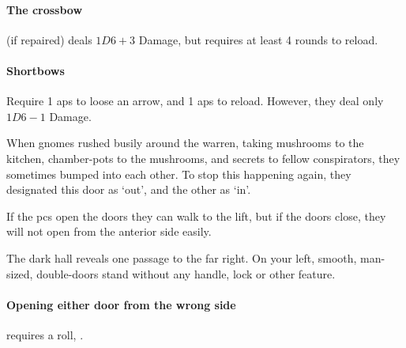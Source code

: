 \begin{multicols}{2}
{  \paragraph{The crossbow}
  (if repaired) deals $1D6+3$ Damage, but requires at least 4 rounds to reload.

  \paragraph{Shortbows}
  Require 1 \glspl{ap} to loose an arrow, and 1 \glspl{ap} to reload.
  However, they deal only $1D6-1$ Damage.
}{}



\begin{exampletext}
  When gnomes rushed busily around the warren, taking mushrooms to the kitchen, chamber-pots to the mushrooms, and secrets to fellow conspirators, they sometimes bumped into each other.
  To stop this happening again, they designated this door as `out', and the other as `in'.
\end{exampletext}

If the \glspl{pc} open the doors they can walk to the lift, but if the doors close, they will not open from the anterior side easily.

\begin{boxtext}
  The dark hall reveals one passage to the far right.
  On your left, smooth, man-sized, double-doors stand without any handle, lock or other feature.
\end{boxtext}

\paragraph{Opening either door from the wrong side}
requires a  roll, \tn[10].


\end{multicols}
